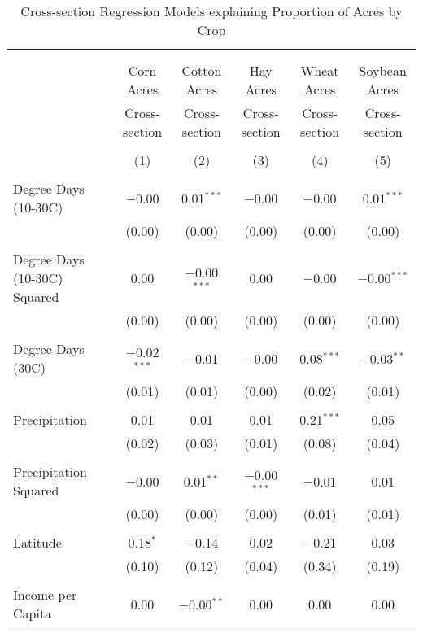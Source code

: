 \documentclass[10pt]{article}
\begin{document}
\begin{table}[!htbp] \centering 
  \caption{Cross-section Regression Models explaining Proportion of Acres by Crop} 
  \label{} 
\footnotesize 
\begin{tabular}{@{\extracolsep{5pt}}lccccc} 
\\[-1.8ex]\hline 
\hline \\[-1.8ex] 
\\[-1.8ex] & Corn Acres & Cotton Acres & Hay Acres & Wheat Acres & Soybean Acres \\ 
 & Cross-section & Cross-section & Cross-section & Cross-section & Cross-section \\ 
\\[-1.8ex] & (1) & (2) & (3) & (4) & (5)\\ 
\hline \\[-1.8ex] 
 Degree Days (10-30C) & $-$0.00 & 0.01$^{***}$ & $-$0.00 & $-$0.00 & 0.01$^{***}$ \\ 
  & (0.00) & (0.00) & (0.00) & (0.00) & (0.00) \\ 
  & & & & & \\ 
 Degree Days (10-30C) Squared & 0.00 & $-$0.00$^{***}$ & 0.00 & $-$0.00 & $-$0.00$^{***}$ \\ 
  & (0.00) & (0.00) & (0.00) & (0.00) & (0.00) \\ 
  & & & & & \\ 
 Degree Days (30C) & $-$0.02$^{***}$ & $-$0.01 & $-$0.00 & 0.08$^{***}$ & $-$0.03$^{**}$ \\ 
  & (0.01) & (0.01) & (0.00) & (0.02) & (0.01) \\ 
  & & & & & \\ 
 Precipitation & 0.01 & 0.01 & 0.01 & 0.21$^{***}$ & 0.05 \\ 
  & (0.02) & (0.03) & (0.01) & (0.08) & (0.04) \\ 
  & & & & & \\ 
 Precipitation Squared & $-$0.00 & 0.01$^{**}$ & $-$0.00$^{***}$ & $-$0.01 & 0.01 \\ 
  & (0.00) & (0.00) & (0.00) & (0.01) & (0.01) \\ 
  & & & & & \\ 
 Latitude & 0.18$^{*}$ & $-$0.14 & 0.02 & $-$0.21 & 0.03 \\ 
  & (0.10) & (0.12) & (0.04) & (0.34) & (0.19) \\ 
  & & & & & \\ 
 Income per Capita & 0.00 & $-$0.00$^{**}$ & 0.00 & 0.00 & 0.00 \\ 

\end{tabular}
\end{table}
\end{document}
